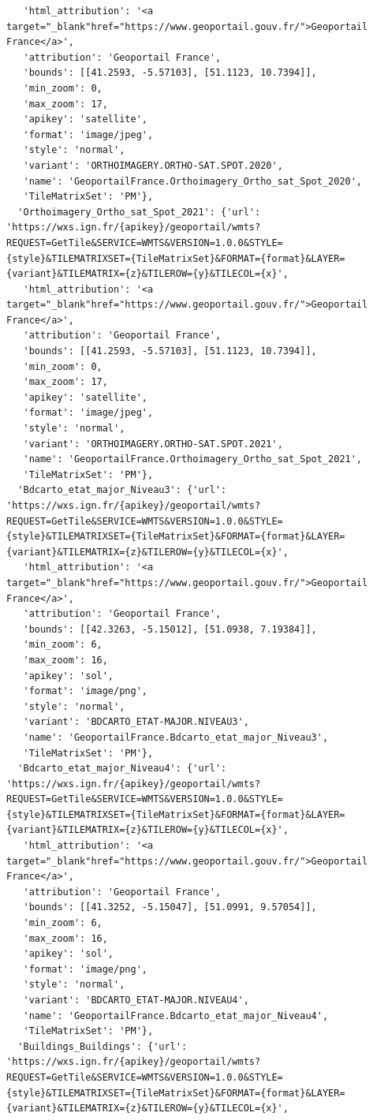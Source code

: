 \documentclass[
  letterpaper,
  DIV=11,
  numbers=noendperiod]{scrreprt}
\begin{document}
\begin{verbatim}
   'html_attribution': '<a target="_blank"href="https://www.geoportail.gouv.fr/">Geoportail France</a>',
   'attribution': 'Geoportail France',
   'bounds': [[41.2593, -5.57103], [51.1123, 10.7394]],
   'min_zoom': 0,
   'max_zoom': 17,
   'apikey': 'satellite',
   'format': 'image/jpeg',
   'style': 'normal',
   'variant': 'ORTHOIMAGERY.ORTHO-SAT.SPOT.2020',
   'name': 'GeoportailFrance.Orthoimagery_Ortho_sat_Spot_2020',
   'TileMatrixSet': 'PM'},
  'Orthoimagery_Ortho_sat_Spot_2021': {'url': 'https://wxs.ign.fr/{apikey}/geoportail/wmts?REQUEST=GetTile&SERVICE=WMTS&VERSION=1.0.0&STYLE={style}&TILEMATRIXSET={TileMatrixSet}&FORMAT={format}&LAYER={variant}&TILEMATRIX={z}&TILEROW={y}&TILECOL={x}',
   'html_attribution': '<a target="_blank"href="https://www.geoportail.gouv.fr/">Geoportail France</a>',
   'attribution': 'Geoportail France',
   'bounds': [[41.2593, -5.57103], [51.1123, 10.7394]],
   'min_zoom': 0,
   'max_zoom': 17,
   'apikey': 'satellite',
   'format': 'image/jpeg',
   'style': 'normal',
   'variant': 'ORTHOIMAGERY.ORTHO-SAT.SPOT.2021',
   'name': 'GeoportailFrance.Orthoimagery_Ortho_sat_Spot_2021',
   'TileMatrixSet': 'PM'},
  'Bdcarto_etat_major_Niveau3': {'url': 'https://wxs.ign.fr/{apikey}/geoportail/wmts?REQUEST=GetTile&SERVICE=WMTS&VERSION=1.0.0&STYLE={style}&TILEMATRIXSET={TileMatrixSet}&FORMAT={format}&LAYER={variant}&TILEMATRIX={z}&TILEROW={y}&TILECOL={x}',
   'html_attribution': '<a target="_blank"href="https://www.geoportail.gouv.fr/">Geoportail France</a>',
   'attribution': 'Geoportail France',
   'bounds': [[42.3263, -5.15012], [51.0938, 7.19384]],
   'min_zoom': 6,
   'max_zoom': 16,
   'apikey': 'sol',
   'format': 'image/png',
   'style': 'normal',
   'variant': 'BDCARTO_ETAT-MAJOR.NIVEAU3',
   'name': 'GeoportailFrance.Bdcarto_etat_major_Niveau3',
   'TileMatrixSet': 'PM'},
  'Bdcarto_etat_major_Niveau4': {'url': 'https://wxs.ign.fr/{apikey}/geoportail/wmts?REQUEST=GetTile&SERVICE=WMTS&VERSION=1.0.0&STYLE={style}&TILEMATRIXSET={TileMatrixSet}&FORMAT={format}&LAYER={variant}&TILEMATRIX={z}&TILEROW={y}&TILECOL={x}',
   'html_attribution': '<a target="_blank"href="https://www.geoportail.gouv.fr/">Geoportail France</a>',
   'attribution': 'Geoportail France',
   'bounds': [[41.3252, -5.15047], [51.0991, 9.57054]],
   'min_zoom': 6,
   'max_zoom': 16,
   'apikey': 'sol',
   'format': 'image/png',
   'style': 'normal',
   'variant': 'BDCARTO_ETAT-MAJOR.NIVEAU4',
   'name': 'GeoportailFrance.Bdcarto_etat_major_Niveau4',
   'TileMatrixSet': 'PM'},
  'Buildings_Buildings': {'url': 'https://wxs.ign.fr/{apikey}/geoportail/wmts?REQUEST=GetTile&SERVICE=WMTS&VERSION=1.0.0&STYLE={style}&TILEMATRIXSET={TileMatrixSet}&FORMAT={format}&LAYER={variant}&TILEMATRIX={z}&TILEROW={y}&TILECOL={x}',

\end{verbatim}
\end{document}
